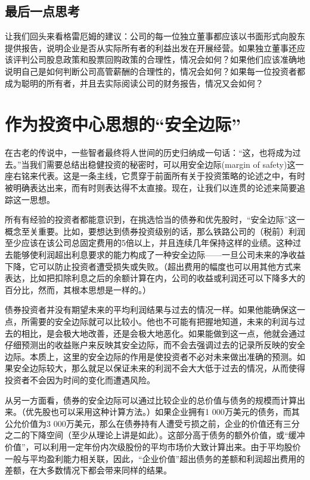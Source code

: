 \documentclass[12pt,oneside]{book}
\begin{document}
\subsection{最后一点思考}
让我们回头来看格雷厄姆的建议：公司的每一位独立董事都应该以书面形式向股东提供报告，说明企业是否从实际所有者的利益出发在开展经营。如果独立董事还应该评判公司股息政策和股票回购政策的合理性，情况会如何？如果他们应该准确地说明自己是如何判断公司高管薪酬的合理性的，情况会如何？如果每一位投资者都成为聪明的所有者，并且去实际阅读公司的财务报告，情况又会如何？



\section{作为投资中心思想的“安全边际”}
在古老的传说中，一些智者最终将人世间的历史归纳成一句话：“这，也将成为过去。”当我们需要总结出稳健投资的秘密时，可以用安全边际(margin of safety)这一座右铭来代表。这是一条主线，它贯穿于前面所有关于投资策略的论述之中，有时被明确表达出来，而有时则表达得不太直接。现在，让我们以连贯的论述来简要追踪这一思想。

所有有经验的投资者都能意识到，在挑选恰当的债券和优先股时，“安全边际”这一概念至关重要。比如，要想达到债券投资级别的话，那么铁路公司的（税前）利润至少应该在该公司总固定费用的5倍以上，并且连续几年保持这样的业绩。这种过去能够使利润超出利息要求的能力构成了一种安全边际——一旦公司未来的净收益下降，它可以防止投资者遭受损失或失败。（超出费用的幅度也可以用其他方式来表达，比如把扣除利息之后的余额计算在内，公司的收益或利润还可以下降多大的百分比，然而，其根本思想是一样的。）

债券投资者并没有期望未来的平均利润结果与过去的情况一样。如果他能确保这一点，所需要的安全边际就可以比较小。他也不可能有把握地知道，未来的利润与过去的相比，是会极大地改善，还是会极大地恶化。如果能做到这一点，他就会通过仔细预测出的收益账户来反映其安全边际，而不会去强调过去的记录所反映的安全边际。本质上，这里的安全边际的作用是使投资者不必对未来做出准确的预测。如果安全边际较大，那么就足以保证未来的利润不会大大低于过去的情况，从而使得投资者不会因为时间的变化而遭遇风险。

从另一方面看，债券的安全边际可以通过比较企业的总价值与债务的规模而计算出来。（优先股也可以采用这种计算方法。）如果企业拥有1 000万美元的债务，而其公允价值为3 000万美元，那么在债券持有人遭受亏损之前，企业的价值还有三分之二的下降空间（至少从理论上讲是如此）。这部分高于债务的额外价值，或“缓冲价值”，可以利用一定年份内次级股份的平均市场价大致计算出来。由于平均股价一般与平均盈利能力相关联，因此，“企业价值”超出债务的差额和利润超出费用的差额，在大多数情况下都会带来同样的结果。
\end{document}
